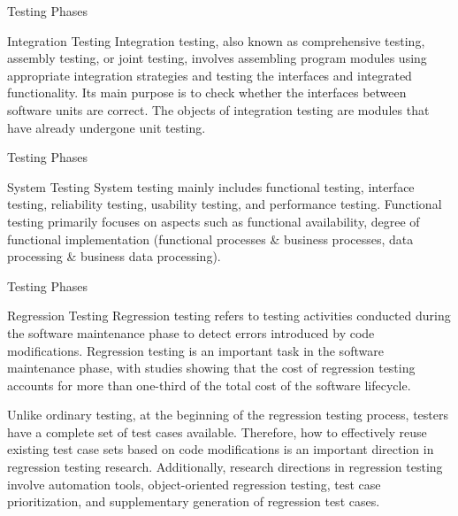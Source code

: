 \documentclass{beamer}
\begin{document}
\begin{frame}[t]{Testing Phases}
    \begin{block}{Integration Testing}
Integration testing, also known as comprehensive testing, assembly testing, or joint testing, involves assembling program modules using appropriate integration strategies and testing the interfaces and integrated functionality. Its main purpose is to check whether the interfaces between software units are correct. The objects of integration testing are modules that have already undergone unit testing.
    \end{block}
\end{frame}

\begin{frame}[t]{Testing Phases}
    \begin{block}{System Testing}
System testing mainly includes functional testing, interface testing, reliability testing, usability testing, and performance testing. Functional testing primarily focuses on aspects such as functional availability, degree of functional implementation (functional processes \& business processes, data processing \& business data processing).
    \end{block}
\end{frame}

\begin{frame}[t]{Testing Phases}
    \begin{block}{Regression Testing}
Regression testing refers to testing activities conducted during the software maintenance phase to detect errors introduced by code modifications. Regression testing is an important task in the software maintenance phase, with studies showing that the cost of regression testing accounts for more than one-third of the total cost of the software lifecycle.

Unlike ordinary testing, at the beginning of the regression testing process, testers have a complete set of test cases available. Therefore, how to effectively reuse existing test case sets based on code modifications is an important direction in regression testing research. Additionally, research directions in regression testing involve automation tools, object-oriented regression testing, test case prioritization, and supplementary generation of regression test cases.
\end{block}
\end{frame}
\end{document}
